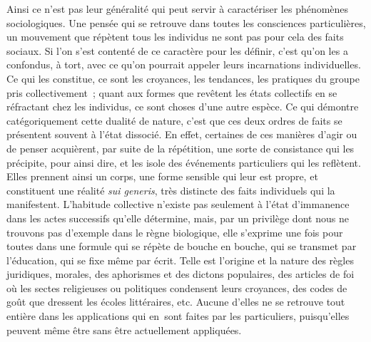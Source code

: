 \documentclass[french,twoside]{book} %
\begin{document}
Ainsi ce n’est pas leur généralité qui peut servir à caractériser les phénomènes sociologiques. Une pensée qui se retrouve dans toutes les consciences particulières, un mouvement que répètent tous les individus ne sont pas pour cela des faits sociaux. Si l’on s’est contenté de ce caractère pour les définir, c’est qu’on les a confondus, à tort, avec ce qu’on pourrait appeler leurs incarnations individuelles. Ce qui les constitue, ce sont les croyances, les tendances, les pratiques du groupe pris collectivement ; quant aux formes que revêtent les états collectifs en se réfractant chez les individus, ce sont choses d’une autre espèce. Ce qui démontre catégoriquement cette dualité de nature, c’est que ces deux ordres de faits se présentent souvent à l’état dissocié. En effet, certaines de ces manières d’agir ou de penser acquièrent, par suite de la répétition, une sorte de consistance qui les précipite, pour ainsi dire, et les isole des événements particuliers qui les reflètent. Elles prennent ainsi un corps, une forme sensible qui leur est propre, et constituent une réalité {\itshape sui generis}, très distincte des faits individuels qui la manifestent. L’habitude collective n’existe pas seulement à l’état d’immanence dans les actes successifs qu’elle détermine, mais, par un privilège dont nous ne trouvons pas d’exemple dans le règne biologique, elle s’exprime une fois pour toutes dans une formule qui se répète de bouche en bouche, qui se transmet par l’éducation, qui se fixe même par écrit. Telle est l’origine et la nature des règles juridiques, morales, des aphorismes et des dictons populaires, des articles de foi où les sectes religieuses ou politiques condensent leurs croyances, des codes de goût que dressent les écoles littéraires, etc. Aucune d’elles ne se retrouve tout entière dans les applications qui en sont faites par les particuliers, puisqu’elles peuvent même être sans être actuellement appliquées.\par
\end{document}
